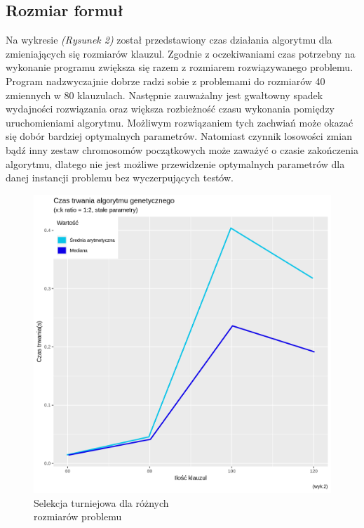\documentclass[twoside,twocolumn]{article}
\begin{document}
\subsection{Rozmiar formuł}
Na wykresie \textit{(Rysunek 2)} został przedstawiony czas działania algorytmu dla zmieniających się rozmiarów klauzul. Zgodnie z oczekiwaniami czas potrzebny na wykonanie programu zwiększa się razem z rozmiarem rozwiązywanego problemu. Program nadzwyczajnie dobrze radzi sobie z problemami do rozmiarów 40 zmiennych w 80 klauzulach. Następnie zauważalny jest gwałtowny spadek wydajności rozwiązania oraz większa rozbieżność czasu wykonania pomiędzy uruchomieniami algorytmu. Możliwym rozwiązaniem tych zachwiań może okazać się dobór bardziej optymalnych parametrów. Natomiast czynnik losowości zmian bądź inny zestaw chromosomów początkowych może zaważyć o czasie zakończenia algorytmu, dlatego nie jest możliwe przewidzenie optymalnych parametrów dla danej instancji problemu bez wyczerpujących testów.
\begin{figure}[h!]
  \centering
    \includegraphics[width=\linewidth]{comp.png}
  \caption{Selekcja turniejowa dla różnych \\rozmiarów problemu}
  \label{fig:coffee}
\end{figure}

\end{document}
